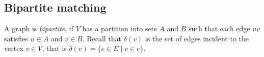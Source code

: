 \subsection{Bipartite matching} 


A graph is
\emph{bipartite}, if $V$ has a partition into sets $A$ and $B$ such
that each  edge $uv$ satisfies $u\in A$ and $v \in B$.
Recall that $\delta(v)$ is the set of edges incident to the vertex $v\in V$,
that is $\delta(v) = \{ e\in E \mid v\in e \}$.







